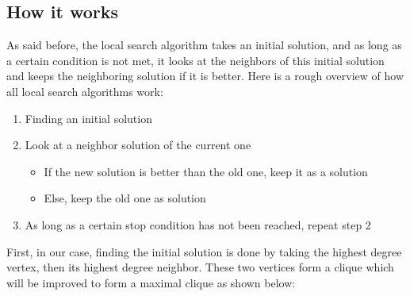 
\subsection{How it works}

As said before, the local search algorithm takes an initial solution, and as long 
as a certain condition is not met, it looks at the neighbors of this initial solution 
and keeps the neighboring solution if it is better. Here is a rough overview of 
how all local search algorithms work:

\begin{enumerate}
    \item Finding an initial solution
    \item Look at a neighbor solution of the current one
    \begin{itemize}
        \item If the new solution is better than the old one, keep it as a solution
        \item Else, keep the old one as solution
    \end{itemize}
    \item As long as a certain stop condition has not been reached, repeat step 2
\end{enumerate}

First, in our case, finding the initial solution is done by taking the highest 
degree vertex, then its highest degree neighbor. These two vertices form a 
clique which will be improved to form a maximal clique as shown below:

